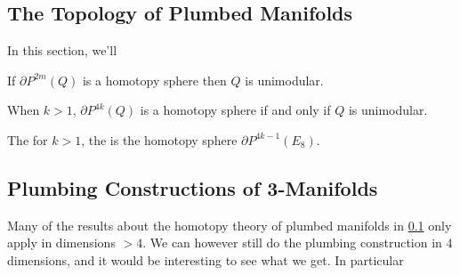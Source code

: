 %
%
%
%
%

\subsection{The Topology of Plumbed Manifolds}\label{sec:homotopy-type-plumbed}

In this section, we'll

\begin{proposition}
	If $\partial P^{2m}(Q)$ is a homotopy sphere then $Q$ is unimodular.
\end{proposition}

\begin{theorem}
	When $k>1$, $\partial P^{4k}(Q)$ is a homotopy sphere if and only if $Q$ is unimodular.
\end{theorem}


\begin{definition}
	The for $k>1$, the  is the homotopy sphere $\partial P^{4k-1}(E_8)$.
\end{definition}

\subsection{Plumbing Constructions of 3-Manifolds}

Many of the results about the homotopy theory of plumbed manifolds in \cref{sec:homotopy-type-plumbed} only apply in dimensions $>4$. We can however still do the plumbing construction in $4$ dimensions, and it would be interesting to see what we get. In particular 

